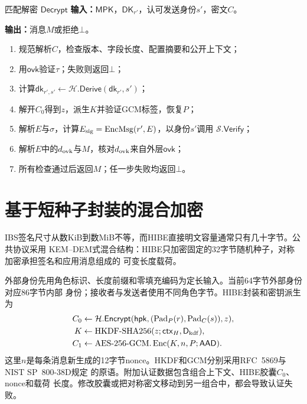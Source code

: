 \begin{ibmealgorithm}{匹配解密 $\mathsf{Decrypt}$}
\label{alg:decrypt}
\textbf{输入：}$\mathsf{MPK}$，$\mathsf{DK}_{r'}$，认可发送身份$s'$，密文$C$。\par
\textbf{输出：}消息$M$或拒绝$\bot$。
\begin{enumerate}
  \item 规范解析$C$，检查版本、字段长度、配置摘要和公开上下文；
  \item 用$\mathsf{ovk}$验证$\tau$；失败则返回$\bot$；
  \item 计算$\mathsf{dk}_{r',s'}\leftarrow\mathcal H.\mathsf{Derive}(\mathsf{dk}_{r'},s')$；
  \item 解开$C_0$得到$z$，派生$K$并验证GCM标签，恢复$P$；
  \item 解析$E$与$\sigma$，计算$E_{\rm sig}=\operatorname{EncMsg}(r',E)$，以身份$s'$调用
        $\mathcal S.\mathsf{Verify}$；
  \item 解析$E$中的$d_{\rm ovk}$与$M$，核对$d_{\rm ovk}$来自外层$\mathsf{ovk}$；
  \item 所有检查通过后返回$M$；任一步失败均返回$\bot$。
\end{enumerate}
\end{ibmealgorithm}

\section{基于短种子封装的混合加密}

IBS签名尺寸从数KiB到数MiB不等，而HIBE直接明文容量通常只有几十字节。公共协议采用
KEM--DEM式混合结构：HIBE只加密固定的32字节随机种子，对称加密承担签名和应用消息组成的
可变长度载荷。

外部身份先用角色标识、长度前缀和零填充编码为定长输入。当前64字节外部身份对应86字节内部
身份；接收者与发送者使用不同角色字节。HIBE封装和密钥派生为
\begin{align*}
 C_0&\leftarrow\mathcal H.\mathsf{Encrypt}
       (\mathsf{hpk},(\operatorname{Pad}_P(r),\operatorname{Pad}_C(s)),z),\\
 K&\leftarrow\operatorname{HKDF\text{-}SHA256}(z;\mathsf{ctx}_H,\mathsf D_{\rm kdf}),\\
 C_1&\leftarrow\operatorname{AES\text{-}256\text{-}GCM.Enc}(K,n,P;\mathsf{AAD}).
\end{align*}
这里$n$是每条消息新生成的12字节nonce。HKDF和GCM分别采用RFC~5869与NIST SP~800-38D规定
的原语\cite{rfc5869,nist2007gcm}。附加认证数据包含组合上下文、HIBE胶囊$C_0$、nonce和载荷
长度。修改胶囊或把对称密文移动到另一组合中，都会导致认证失败。

